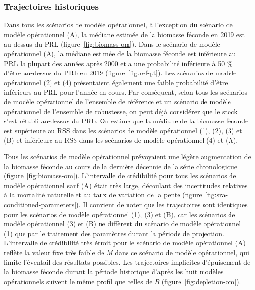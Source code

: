 \documentclass[11pt]{book}
\begin{document}
\hypertarget{sec:approach3-conditioning-trajectories}{%
\subsubsection{Trajectoires historiques}\label{sec:approach3-conditioning-trajectories}}

Dans tous les scénarios de modèle opérationnel, à l'exception du scénario de modèle opérationnel (A), la médiane estimée de la biomasse féconde en 2019 est au-dessus du PRL (figure~\ref{fig:biomass-om}). Dans le scénario de modèle opérationnel (A), la médiane estimée de la biomasse féconde est inférieure au PRL la plupart des années après 2000 et a une probabilité inférieure à 50 \% d'être au-dessus du PRL en 2019 (figure~\ref{fig:ref-pt}). Les scénarios de modèle opérationnel (2) et (4) présentaient également une faible probabilité d'être inférieurs au PRL pour l'année en cours. Par conséquent, selon tous les scénarios de modèle opérationnel de l'ensemble de référence et un scénario de modèle opérationnel de l'ensemble de robustesse, on peut déjà considérer que le stock s'est rétabli au-dessus du PRL. On estime que la médiane de la biomasse féconde est supérieure au RSS dans les scénarios de modèle opérationnel (1), (2), (3) et (B) et inférieure au RSS dans les scénarios de modèle opérationnel (4) et (A).

Tous les scénarios de modèle opérationnel prévoyaient une légère augmentation de la biomasse féconde au cours de la dernière décennie de la série chronologique (figure~\ref{fig:biomass-om}). L'intervalle de crédibilité pour tous les scénarios de modèle opérationnel sauf (A) était très large, découlant des incertitudes relatives à la mortalité naturelle et au taux de variation de la pente (figure~\ref{fig:sra-conditioned-parameters}). Il convient de noter que les trajectoires sont identiques pour les scénarios de modèle opérationnel (1), (3) et (B), car les scénarios de modèle opérationnel (3) et (B) ne diffèrent du scénario de modèle opérationnel (1) que par le traitement des paramètres durant la période de projection. L'intervalle de crédibilité très étroit pour le scénario de modèle opérationnel (A) reflète la valeur fixe très faible de \emph{M} dans ce scénario de modèle opérationnel, qui limite l'éventail des résultats possibles. Les trajectoires implicites d'épuisement de la biomasse féconde durant la période historique d'après les huit modèles opérationnels suivent le même profil que celles de \emph{B} (figure~\ref{fig:depletion-om}).
\end{document}
